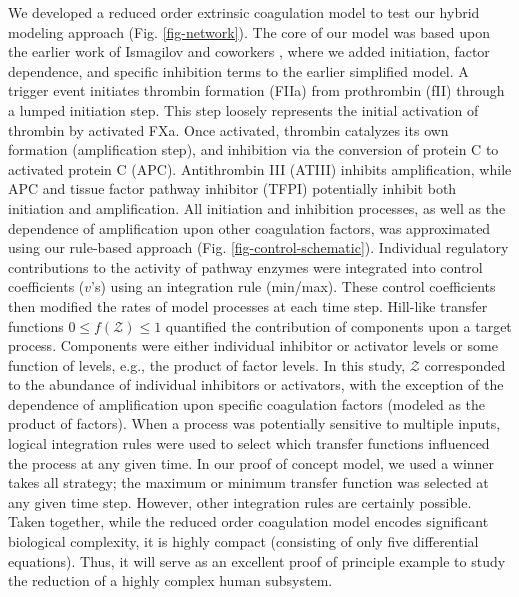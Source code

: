 \documentclass[processes,article,received,moreauthors,pdftex,12pt,a4paper]{mdpi}
\begin{document}
We developed a reduced order extrinsic coagulation model to test our hybrid modeling approach (Fig. \ref{fig-network}).
The core of our model was based upon the earlier work of Ismagilov and coworkers \citep{Runyon:2004aa,Kastrup:2006aa,Runyon:2007aa,Runyon:2008aa}, 
where we added initiation, factor dependence, and specific inhibition terms to the earlier simplified model.
A trigger event initiates thrombin formation (FIIa) from prothrombin (fII) through a lumped initiation step.
This step loosely represents the initial activation of thrombin by activated FXa.
Once activated, thrombin catalyzes its own formation (amplification step), and inhibition via the conversion of protein C to activated protein C (APC).
Antithrombin III (ATIII) inhibits amplification, while APC and tissue factor pathway inhibitor (TFPI) potentially inhibit both initiation and amplification. 
All initiation and inhibition processes, as well as the dependence of amplification upon other coagulation factors, was approximated using our rule-based approach (Fig. \ref{fig-control-schematic}). 
Individual regulatory contributions to the activity of pathway enzymes were integrated into control coefficients ($v$'s) using an integration rule (min/max).  
These control coefficients then modified the rates of model processes at each time step.
Hill-like transfer functions $0 \leq f\left(\mathcal{Z}\right) \leq 1$ quantified the contribution of components upon a target process. 
Components were either individual inhibitor or activator levels or some function of levels, e.g., the product of factor levels. 
In this study, $\mathcal{Z}$ corresponded to the abundance of individual inhibitors or activators, 
with the exception of the dependence of amplification upon specific coagulation factors (modeled as the product of factors). 
When a process was potentially sensitive to multiple inputs, logical integration rules were used to select which transfer functions influenced the process at any given time. 
In our proof of concept model, we used a winner takes all strategy; the maximum or minimum transfer function was selected at any given time step. 
However, other integration rules are certainly possible. 
Taken together, while the reduced order coagulation model encodes significant biological complexity, it is highly compact (consisting of only five differential equations). 
Thus, it will serve as an excellent proof of principle example to study the reduction of a highly complex human subsystem.  
\end{document}

